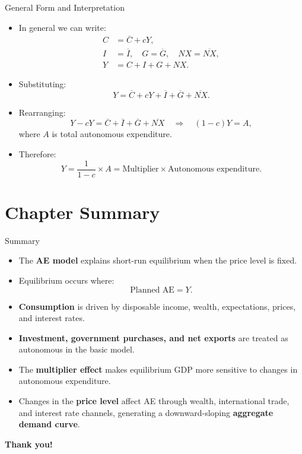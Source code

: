\documentclass[aspectratio=169]{beamer}
\begin{document}
\begin{frame}{General Form and Interpretation}
\transfade
\begin{itemize}
  \item In general we can write:
  \begin{align*}
    C &= \overline{C} + cY,\\
    I &= \overline{I},\quad
    G = \overline{G},\quad
    NX = \overline{NX},\\
    Y &= C + I + G + NX.
  \end{align*}
  \item Substituting:
  \[
    Y = \overline{C} + cY + \overline{I} + \overline{G} + \overline{NX}.
  \]
  \item Rearranging:
  \[
    Y - cY = \overline{C} + \overline{I} + \overline{G} + \overline{NX}
    \quad \Rightarrow \quad
    (1 - c)Y = A,
  \]
  where \(A\) is total autonomous expenditure.
  \item Therefore:
  \[
    Y = \frac{1}{1 - c} \times A
      = \text{Multiplier} \times \text{Autonomous expenditure}.
  \]
\end{itemize}
\end{frame}

\section*{Chapter Summary}

\begin{frame}{Summary}
\transfade
\begin{itemize}
  \item The \textbf{AE model} explains short-run equilibrium when the price level is fixed.
  \item Equilibrium occurs where:
  \[
    \text{Planned AE} = Y.
  \]
  \item \textbf{Consumption} is driven by disposable income, wealth, expectations, prices, and interest rates.
  \item \textbf{Investment, government purchases, and net exports} are treated as autonomous in the basic model.
  \item The \textbf{multiplier effect} makes equilibrium GDP more sensitive to changes in autonomous expenditure.
  \item Changes in the \textbf{price level} affect AE through wealth, international trade, and interest rate channels, generating a downward-sloping \textbf{aggregate demand curve}.
\end{itemize}
\end{frame}

\begin{frame}
\centering
\Huge \textbf{Thank you!}
\end{frame}
\end{document}

